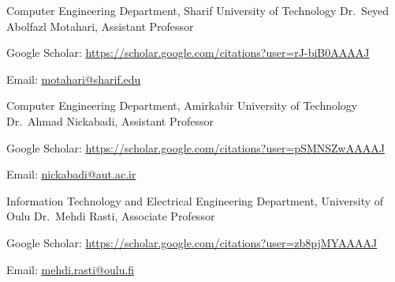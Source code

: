 \begin{cventries}
  \cventry
    {Computer Engineering Department, Sharif University of Technology} %
    {Dr.~Seyed Abolfazl Motahari, Assistant Professor} %
    {} %
    {} %
    {
      \begin{cvitems} %
        \item {Google Scholar: \href{https://scholar.google.com/citations?user=rJ-biB0AAAAJ&hl=en}{https://scholar.google.com/citations?user=rJ-biB0AAAAJ}}
        \item {Email: \href{mailto:motahari@sharif.edu}{motahari@sharif.edu}}
      \end{cvitems}
    }


  \cventry
    {Computer Engineering Department, Amirkabir University of Technology} %
    {Dr.~Ahmad Nickabadi, Assistant Professor} %
    {} %
    {} %
    {
      \begin{cvitems} %
        \item {Google Scholar: \href{https://scholar.google.com/citations?user=pSMNSZwAAAAJ&hl=en}{https://scholar.google.com/citations?user=pSMNSZwAAAAJ}}
        \item {Email: \href{mailto:nickabadi@aut.ac.ir}{nickabadi@aut.ac.ir}}
      \end{cvitems}
    }

  \cventry
    {Information Technology and Electrical Engineering Department, University of Oulu} %
    {Dr.~Mehdi Rasti, Associate Professor} %
    {} %
    {} %
    {
      \begin{cvitems} %
        \item {Google Scholar: \href{https://scholar.google.com/citations?user=zb8pjMYAAAAJ&hl=en}{https://scholar.google.com/citations?user=zb8pjMYAAAAJ}}
        \item {Email: \href{mailto:mehdi.rasti@oulu.fi}{mehdi.rasti@oulu.fi}}
      \end{cvitems}
    }



\end{cventries}
